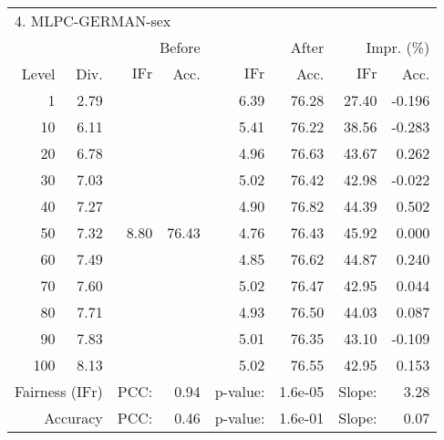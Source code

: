 \begin{tabular}{rr||rr|rr|rr}
\multicolumn{4}{l}{4. MLPC-GERMAN-sex} & \multicolumn{2}{c}{} & \multicolumn{2}{c}{}\\
 &  & \multicolumn{2}{r|}{Before} & \multicolumn{2}{r|}{After} & \multicolumn{2}{r}{Impr. (\%)}\\
Level & Div. & $\mathrm{IFr}$ & Acc. & $\mathrm{IFr}$ & Acc. & $\mathrm{IFr}$ & Acc.\\
\hline
1 & 2.79 & \multirow{11}{*}{8.80} & \multirow{11}{*}{76.43} & 6.39 & 76.28 & 27.40 & -0.196\\
10 & 6.11 &  &  & 5.41 & 76.22 & 38.56 & -0.283\\
20 & 6.78 &  &  & 4.96 & 76.63 & 43.67 & 0.262\\
30 & 7.03 &  &  & 5.02 & 76.42 & 42.98 & -0.022\\
40 & 7.27 &  &  & 4.90 & 76.82 & 44.39 & 0.502\\
50 & 7.32 &  &  & 4.76 & 76.43 & 45.92 & 0.000\\
60 & 7.49 &  &  & 4.85 & 76.62 & 44.87 & 0.240\\
70 & 7.60 &  &  & 5.02 & 76.47 & 42.95 & 0.044\\
80 & 7.71 &  &  & 4.93 & 76.50 & 44.03 & 0.087\\
90 & 7.83 &  &  & 5.01 & 76.35 & 43.10 & -0.109\\
100 & 8.13 &  &  & 5.02 & 76.55 & 42.95 & 0.153\\
\hline
\multicolumn{2}{r}{Fairness ($\mathrm{IFr}$)} & PCC: & \multicolumn{1}{r}{0.94} & p-value:  & \multicolumn{1}{r}{1.6e-05} & Slope:  & 3.28\\
\multicolumn{2}{r}{Accuracy} & PCC: & \multicolumn{1}{r}{0.46} & p-value:  & \multicolumn{1}{r}{1.6e-01} & Slope:  & 0.07\\
\end{tabular}